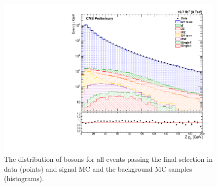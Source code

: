 \begin{figure}[p]
    \centering
    \includegraphics[width=\textwidth]{figures/z_pt.pdf}
    \caption[
        The \bosonpt distribution of \Z bosons in data and MC with \MADGRAPH
        signal MC.
    ]{
        The \bosonpt distribution of \Z bosons for all events passing the final
        selection in data (points) and \MADGRAPH signal MC and the background
        MC samples (histograms).
    }
    \label{fig:z_pt}
\end{figure}

